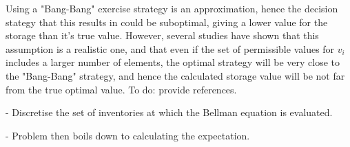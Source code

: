 \documentclass{article}
\begin{document}
\bigskip

Using a "Bang-Bang" exercise strategy is an approximation, hence the decision stategy that
this results in could be suboptimal, giving a lower value for the storage than it's true
value. However, several studies have shown that this assumption is a realistic one, and that
even if the set of permissible values for $v_i$ includes a larger number of elements, the
optimal strategy will be very close to the "Bang-Bang" strategy, and hence the calculated 
storage value will be not far from the true optimal value.
To do: provide references.


- Discretise the set of inventories at which the Bellman equation is evaluated.

- Problem then boils down to calculating the expectation.
\end{document}
